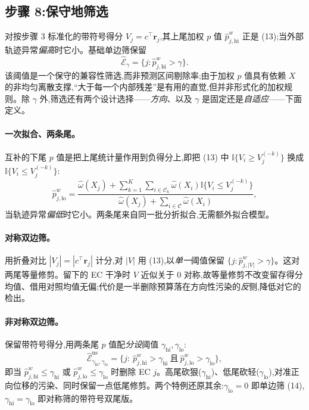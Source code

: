 \documentclass[11pt]{article}
\newcommand{\ind}{\mathbb{I}}
\begin{document}
\subsection{步骤 8:保守地筛选}\label{sec:screen}

对按步骤 3 标准化的带符号得分 $V_j=c^{\top}\bm r_j$,其上尾加权 $p$ 值 $\widehat p_{j,\mathrm{hi}}^{w}$ 正是 (13);当外部轨迹异常\emph{偏高}时它小。基础单边筛保留
\[
\widehat{\mathcal E}_{\gamma}
=
\{j:\widehat p_{j,\mathrm{hi}}^{w}>\gamma\}.
\tag{14}
\]
该阈值是一个保守的兼容性筛选,而非预测区间剔除率;由于加权 $p$ 值具有依赖 $X$ 的非均匀离散支撑,``大于每一个内部残差''是有用的直觉,但并非形式化的加权规则。除 $\gamma$ 外,筛选还有两个设计选择——\emph{方向}、以及 $\gamma$ 是固定还是\emph{自适应}——下面定义。

\paragraph{一次拟合、两条尾。} 互补的下尾 $p$ 值是把上尾统计量作用到负得分上,即把 (13) 中 $\ind\{V_i\ge V_j^{(-k)}\}$ 换成 $\ind\{V_i\le V_j^{(-k)}\}$:
\[
\widehat p_{j,\mathrm{lo}}^{w}
=
\frac{\widehat\omega(X_j)+\sum_{k=1}^{K}\sum_{i\in\mathcal C_k}\widehat\omega(X_i)\ind\{V_i\le V_j^{(-k)}\}}
{\widehat\omega(X_j)+\sum_{i\in\mathcal C}\widehat\omega(X_i)},
\]
当轨迹异常\emph{偏低}时它小。两条尾来自同一批分折拟合,无需额外拟合模型。

\paragraph{对称双边筛。} 用折叠对比 $|V_j|=|c^{\top}\bm r_j|$ 计分,对 $|V|$ 用 (13),以\emph{单一}阈值保留 $\{j:\widehat p_{j,|V|}^{w}>\gamma\}$。这对两尾等量修剪。留下的 EC 干净时 $V$ 近似关于 $0$ 对称,故等量修剪不改变留存得分均值、借用对照均值无偏;代价是一半删除预算落在方向性污染的\emph{反}侧,降低对它的检出。

\paragraph{非对称双边筛。} 保留带符号得分,用两条尾 $p$ 值配\emph{分设}阈值 $\gamma_{\mathrm{hi}},\gamma_{\mathrm{lo}}$:
\[
\widehat{\mathcal E}_{\gamma_{\mathrm{hi}},\gamma_{\mathrm{lo}}}^{\mathrm{ns}}
=
\bigl\{j:\ \widehat p_{j,\mathrm{hi}}^{w}>\gamma_{\mathrm{hi}}\ \text{且}\ \widehat p_{j,\mathrm{lo}}^{w}>\gamma_{\mathrm{lo}}\bigr\},
\]
即当 $\widehat p_{j,\mathrm{hi}}^{w}\le\gamma_{\mathrm{hi}}$ 或 $\widehat p_{j,\mathrm{lo}}^{w}\le\gamma_{\mathrm{lo}}$ 时删除 EC $j$。高尾砍狠($\gamma_{\mathrm{hi}}$)、低尾砍轻($\gamma_{\mathrm{lo}}$),对准正向位移的污染、同时保留一点低尾修剪。两个特例还原其余:$\gamma_{\mathrm{lo}}{=}0$ 即单边筛 (14),$\gamma_{\mathrm{hi}}{=}\gamma_{\mathrm{lo}}$ 即对称筛的带符号双尾版。
\end{document}
